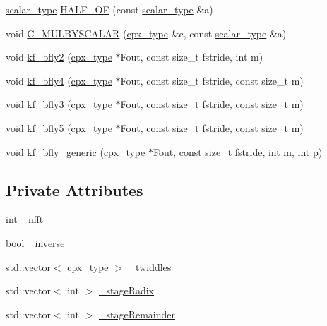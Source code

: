 \begin{DoxyCompactItemize}
\item 
\hyperlink{classkissfft_a074a5f74883901c625b6e80660d16ad4}{scalar\+\_\+type} \hyperlink{classkissfft_aca22ce3dafcd91ffca189121367fd026}{H\+A\+L\+F\+\_\+\+OF} (const \hyperlink{classkissfft_a074a5f74883901c625b6e80660d16ad4}{scalar\+\_\+type} \&a)
\item 
void \hyperlink{classkissfft_a25bc023cec82dce6d314dea8c124349a}{C\+\_\+\+M\+U\+L\+B\+Y\+S\+C\+A\+L\+AR} (\hyperlink{classkissfft_af66664488b0b1b2995f3e4c2f63a8b7d}{cpx\+\_\+type} \&c, const \hyperlink{classkissfft_a074a5f74883901c625b6e80660d16ad4}{scalar\+\_\+type} \&a)
\item 
void \hyperlink{classkissfft_a88750fa038b343d9e94bdcefc66cf604}{kf\+\_\+bfly2} (\hyperlink{classkissfft_af66664488b0b1b2995f3e4c2f63a8b7d}{cpx\+\_\+type} $\ast$Fout, const size\+\_\+t fstride, int m)
\item 
void \hyperlink{classkissfft_a64876ee331b8349c63873207a87880db}{kf\+\_\+bfly4} (\hyperlink{classkissfft_af66664488b0b1b2995f3e4c2f63a8b7d}{cpx\+\_\+type} $\ast$Fout, const size\+\_\+t fstride, const size\+\_\+t m)
\item 
void \hyperlink{classkissfft_a5eafd09bfe32414e9efca3f74ca99266}{kf\+\_\+bfly3} (\hyperlink{classkissfft_af66664488b0b1b2995f3e4c2f63a8b7d}{cpx\+\_\+type} $\ast$Fout, const size\+\_\+t fstride, const size\+\_\+t m)
\item 
void \hyperlink{classkissfft_af6b0264b4e13de975edaa006b2ab98b6}{kf\+\_\+bfly5} (\hyperlink{classkissfft_af66664488b0b1b2995f3e4c2f63a8b7d}{cpx\+\_\+type} $\ast$Fout, const size\+\_\+t fstride, const size\+\_\+t m)
\item 
void \hyperlink{classkissfft_abf9a27bb71715184e6886ee38c371650}{kf\+\_\+bfly\+\_\+generic} (\hyperlink{classkissfft_af66664488b0b1b2995f3e4c2f63a8b7d}{cpx\+\_\+type} $\ast$Fout, const size\+\_\+t fstride, int m, int p)
\end{DoxyCompactItemize}
\subsection*{Private Attributes}
\begin{DoxyCompactItemize}
\item 
int \hyperlink{classkissfft_abbfab972dff7a11d401150233e54041d}{\+\_\+nfft}
\item 
bool \hyperlink{classkissfft_af0fce7031f3363ac6305d9c1f5da0008}{\+\_\+inverse}
\item 
std\+::vector$<$ \hyperlink{classkissfft_af66664488b0b1b2995f3e4c2f63a8b7d}{cpx\+\_\+type} $>$ \hyperlink{classkissfft_abd5d6e3a0d08f56c711590d890fdd740}{\+\_\+twiddles}
\item 
std\+::vector$<$ int $>$ \hyperlink{classkissfft_a89d4645ae457422179835a92f2e4bf7c}{\+\_\+stage\+Radix}
\item 
std\+::vector$<$ int $>$ \hyperlink{classkissfft_a112fd0185ddaaf837cab9e7abb839d13}{\+\_\+stage\+Remainder}
\end{DoxyCompactItemize}


